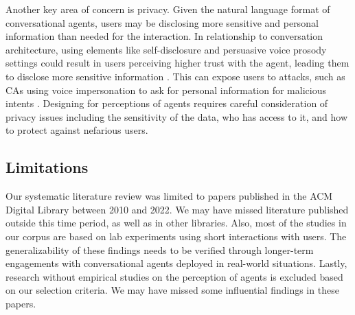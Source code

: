 Another key area of concern is privacy. Given the natural language format of conversational agents, users may be disclosing more sensitive and personal information than needed for the interaction. In relationship to conversation architecture, using elements like self-disclosure and persuasive voice prosody settings could result in users perceiving higher trust with the agent, leading them to disclose more sensitive information  \cite{dubiel2020persuasive, lee2020hear}\cmt{[60][23]}. This can expose users to attacks, such as CAs using voice impersonation to ask for personal information for malicious intents \cite{chan2021kinvoices}\cmt{[74]}. Designing for perceptions of agents requires careful consideration of privacy issues including the sensitivity of the data, who has access to it, and how to protect against nefarious users.

\subsection{Limitations}

Our systematic literature review was limited to papers published in the ACM Digital Library between 2010 and 2022. We may have missed literature published outside this time period, as well as in other libraries. Also, most of the studies in our corpus are based on lab experiments using short interactions with users. The generalizability of these findings needs to be verified through longer-term engagements with conversational agents deployed in real-world situations. Lastly, research without empirical studies on the perception of agents is excluded based on our selection criteria. We may have missed some influential findings in these papers. %